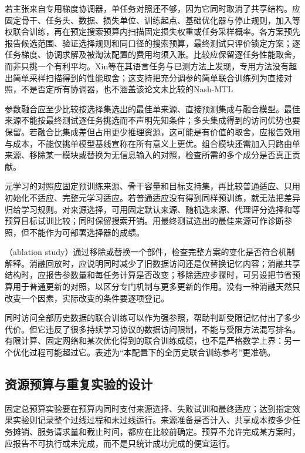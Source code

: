 若主张来自专用梯度协调器，单任务对照还不够，因为它同时取消了共享结构。应固定骨干、任务头、数据、损失单位、训练起点、基础优化器与停止规则，加入等权联合训练，再在预定搜索预算内扫描固定损失权重或任务采样概率。各方案预先报告候选范围、验证选择规则和同口径的搜索预算，最终测试只评价锁定方案；逐任务梯度、协调求解及被淘汰配置的费用均须入账。比较应保留逐任务性能取舍，而非只挑一个有利平均。Xin等在其语言任务与已测方法上发现，专用方法没有超出简单采样扫描得到的性能取舍；这支持把充分调参的简单联合训练列为直接对照，不是否定所有协调器，也不涵盖该论文未比较的Nash-MTL

参数融合应至少比较按选择集选出的最佳单来源、直接预测集成与融合模型。最佳来源不能按最终测试逐任务挑选而不声明先知条件；多头集成得到的访问优势也要保留。若融合比集成差但占用更少推理资源，这可能是有价值的取舍，应报告效用与成本，不能仅挑单模型基线宣称在所有意义上更优。组合模块还需加入只路由单来源、移除某一模块或替换为无信息输入的对照，检查所需的多个成分是否真正贡献。

元学习的对照应固定预训练来源、骨干容量和目标支持集，再比较普通适应、只用初始化不适应、完整元学习适应。若普通适应没有得到同样预训练，就无法把差异归给学习规则。对来源选择，可用固定默认来源、随机选来源、代理评分选择和等预算目标试训比较；同时保留搜索开销。用最终测试选出的最佳来源可作诊断参照，但不能作为可部署选择器的成绩。

（ablation study）通过移除或替换一个部件，检查完整方案的变化是否符合机制解释。消融回放时，应说明同时减少了旧数据访问还是仅替换记忆内容；消融共享结构时，应报告参数量和每任务计算是否改变；移除适应步骤时，可另设把节省预算用于普通更新的对照，以区分专门机制与更多更新的作用。没有一种消融天然只改变一个因素，实际改变的条件要逐项登记。

同时访问全部历史数据的联合训练可以作为强参照，帮助判断受限记忆付出了多少代价。但它违反了很多持续学习协议的数据访问限制，不能与受限方法混写排名。有限计算、固定网络和某次优化得到的联合训练成绩，也不是严格数学上界：另一个优化过程可能超过它。表述为“本配置下的全历史联合训练参考”更准确。

\subsection{资源预算与重复实验的设计}
\label{sec:ket-evaluation-repeats}

固定总预算实验要在预算内同时支付来源选择、失败试训和最终适应；达到指定效果实验则记录整个过线过程和未过线运行。来源准备是否计入、共享成本按多少任务摊销、服务请求量和截止时间，都应在比较前确定。预算不允许完成某方案时，应报告不可执行或未完成，而不是只统计成功完成的便宜运行。

